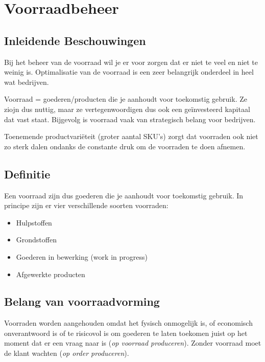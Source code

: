 \section{Voorraadbeheer}

\subsection{Inleidende Beschouwingen}
Bij het beheer van de voorraad wil je er voor zorgen dat er niet te veel en niet te weinig is. Optimalisatie van de voorraad is een zeer belangrijk onderdeel in heel wat bedrijven.

Voorraad = goederen/producten die je aanhoudt voor toekomstig gebruik. Ze ziojn dus nuttig, maar ze vertegenwoordigen dus ook een ge\"investeerd kapitaal dat vast staat. Bijgevolg is voorraad vaak van strategisch belang voor bedrijven.

Toenemende productvari\"eteit (groter aantal SKU's) zorgt dat voorraden ook niet zo sterk dalen ondanks de constante druk om de voorraden te doen afnemen.

\subsection{Definitie}
Een voorraad zijn dus goederen die je aanhoudt voor toekomstig gebruik. In principe zijn er vier verschillende soorten voorraden:
\begin{itemize}
    \item Hulpstoffen
    \item Grondstoffen
    \item Goederen in bewerking (work in progress)
    \item Afgewerkte producten
\end{itemize}

\subsection{Belang van voorraadvorming}
Voorraden worden aangehouden omdat het fysisch onmogelijk is, of economisch onverantwoord is of te risicovol is om goederen te laten toekomen juist op het moment dat er een vraag naar is (\textit{op voorraad produceren}). Zonder voorraad moet de klant wachten (\textit{op order produceren}).


